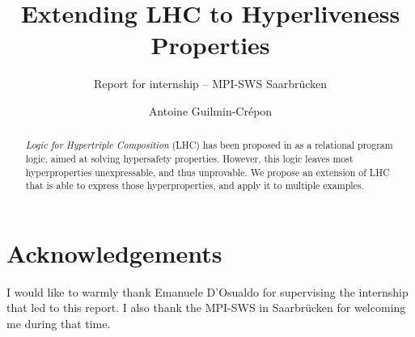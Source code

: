 \documentclass[acmsmall,screen,nonacm,appendix]{acmart}
\title{Extending LHC to Hyperliveness Properties}
\subtitle{Report for internship -- MPI-SWS Saarbrücken}
\author{Antoine Guilmin-Crépon}
\affiliation{%
  \institution{ENS Paris-Saclay}
  \city{Gif-Sur-Yvette}
  \country{France}
}
\begin{document}
\begin{abstract}
  \emph{Logic for Hypertriple Composition} (LHC) has been proposed in \citet{DOsualdo22} as a relational program logic, aimed at solving hypersafety properties. However, this logic leaves most hyperproperties unexpressable, and thus unprovable. We propose an extension of LHC that is able to express those hyperproperties, and apply it to multiple examples. 
\end{abstract}

\maketitle







\section*{Acknowledgements}

I would like to warmly thank Emanuele D'Osualdo for supervising the internship that led to this report. I also thank the MPI-SWS in Saarbrücken for welcoming me during that time.



\appendix


\newpage


\end{document}
